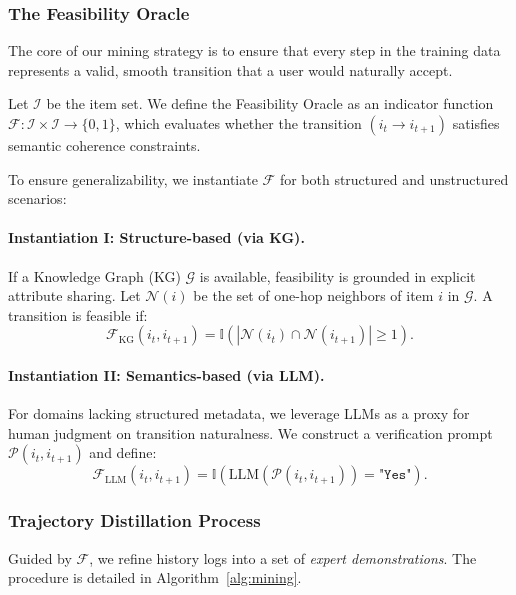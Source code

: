 \documentclass{llmxive}
\begin{document}
\subsubsection{The Feasibility Oracle}
The core of our mining strategy is to ensure that every step in the training data represents a valid, smooth transition that a user would naturally accept.

\begin{definition}
Let $\mathcal{I}$ be the item set. We define the Feasibility Oracle as an indicator function $\mathcal{F}: \mathcal{I} \times \mathcal{I} \to \{0, 1\}$, which evaluates whether the transition $(i_t \to i_{t+1})$ satisfies semantic coherence constraints.
\end{definition}

To ensure generalizability, we instantiate $\mathcal{F}$ for both structured and unstructured scenarios:

\paragraph{Instantiation I: Structure-based (via KG).}
If a Knowledge Graph (KG) $\mathcal{G}$ is available, feasibility is grounded in explicit attribute sharing. Let $\mathcal{N}(i)$ be the set of one-hop neighbors of item $i$ in $\mathcal{G}$. A transition is feasible if:
\begin{equation}
    \mathcal{F}_{\text{KG}}(i_t, i_{t+1}) = \mathbb{I}(|\mathcal{N}(i_t) \cap \mathcal{N}(i_{t+1})| \ge 1).
\end{equation}

\paragraph{Instantiation II: Semantics-based (via LLM).}
For domains lacking structured metadata, we leverage LLMs as a proxy for human judgment on transition naturalness. We construct a verification prompt $\mathcal{P}(i_t, i_{t+1})$ and define:
\begin{equation}
    \mathcal{F}_{\text{LLM}}(i_t, i_{t+1}) = \mathbb{I}(\text{LLM}(\mathcal{P}(i_t, i_{t+1})) = \texttt{"Yes"}).
\end{equation}

\subsubsection{Trajectory Distillation Process}
Guided by $\mathcal{F}$, we refine history logs into a set of \textit{expert demonstrations}. The procedure is detailed in Algorithm~\ref{alg:mining}.
\end{document}
